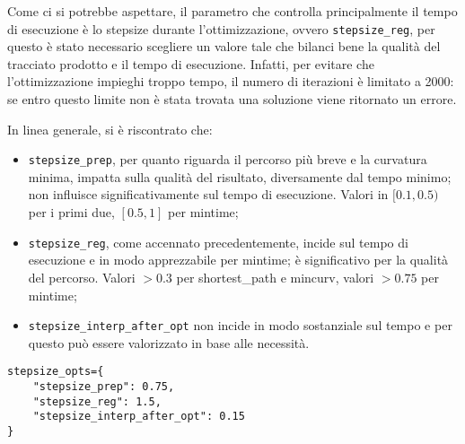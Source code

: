 Come ci si potrebbe aspettare, il parametro che controlla principalmente il tempo di esecuzione è lo
stepsize durante l'ottimizzazione, ovvero \verb|stepsize_reg|, per questo è stato necessario scegliere un
valore tale che bilanci bene la qualità del tracciato prodotto e il tempo di esecuzione. Infatti, per
evitare che l'ottimizzazione impieghi troppo tempo, il numero di iterazioni è limitato a 2000: se entro
questo limite non è stata trovata una soluzione viene ritornato un errore.

In linea generale, si è riscontrato che:
\begin{itemize}
	\item \verb|stepsize_prep|, per quanto riguarda il percorso più breve e la curvatura minima, impatta
		sulla qualità del risultato, diversamente dal tempo minimo; non influisce significativamente sul
		tempo di esecuzione. Valori in $[0.1, 0.5)$ per i primi due, $[0.5, 1]$ per mintime;
	\item \verb|stepsize_reg|, come accennato precedentemente, incide sul tempo di esecuzione
		e in modo apprezzabile per mintime; è significativo per la qualità del percorso. Valori $ > 0.3$
		per shortest\_path e mincurv, valori $> 0.75$ per mintime;
	\item \verb|stepsize_interp_after_opt| non incide in modo sostanziale sul tempo e per questo può
		essere valorizzato in base alle necessità.
\end{itemize}

\begin{lstlisting}
stepsize_opts={
	"stepsize_prep": 0.75,
	"stepsize_reg": 1.5,
	"stepsize_interp_after_opt": 0.15
}
\end{lstlisting}


